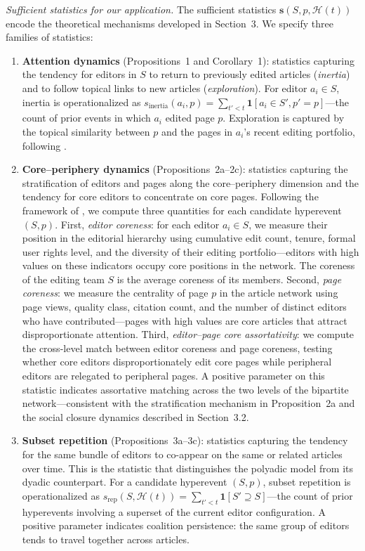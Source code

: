 \documentclass[11pt]{article}
\begin{document}
\emph{Sufficient statistics for our application.} The sufficient statistics $\mathbf{s}(S, p, \mathcal{H}(t))$ encode the theoretical mechanisms developed in Section~3. We specify three families of statistics:

\begin{enumerate}[leftmargin=*, itemsep=4pt]
\item \textbf{Attention dynamics} (Propositions~1 and Corollary~1): statistics capturing the tendency for editors in $S$ to return to previously edited articles (\emph{inertia}) and to follow topical links to new articles (\emph{exploration}). For editor $a_i \in S$, inertia is operationalized as $s_{\text{inertia}}(a_i, p) = \sum_{t' < t} \mathbf{1}[a_i \in S', p' = p]$---the count of prior events in which $a_i$ edited page $p$. Exploration is captured by the topical similarity between $p$ and the pages in $a_i$'s recent editing portfolio, following \citet{Tonellato2024}.

\item \textbf{Core--periphery dynamics} (Propositions~2a--2c): statistics capturing the stratification of editors and pages along the core--periphery dimension and the tendency for core editors to concentrate on core pages. Following the framework of \citet{Borgatti2000}, we compute three quantities for each candidate hyperevent $(S, p)$. First, \emph{editor coreness}: for each editor $a_i \in S$, we measure their position in the editorial hierarchy using cumulative edit count, tenure, formal user rights level, and the diversity of their editing portfolio---editors with high values on these indicators occupy core positions in the network. The coreness of the editing team $S$ is the average coreness of its members. Second, \emph{page coreness}: we measure the centrality of page $p$ in the article network using page views, quality class, citation count, and the number of distinct editors who have contributed---pages with high values are core articles that attract disproportionate attention. Third, \emph{editor--page core assortativity}: we compute the cross-level match between editor coreness and page coreness, testing whether core editors disproportionately edit core pages while peripheral editors are relegated to peripheral pages. A positive parameter on this statistic indicates assortative matching across the two levels of the bipartite network---consistent with the stratification mechanism in Proposition~2a and the social closure dynamics described in Section~3.2.

\item \textbf{Subset repetition} (Propositions~3a--3c): statistics capturing the tendency for the same bundle of editors to co-appear on the same or related articles over time. This is the statistic that distinguishes the polyadic model from its dyadic counterpart. For a candidate hyperevent $(S, p)$, subset repetition is operationalized as $s_{\text{rep}}(S, \mathcal{H}(t)) = \sum_{t' < t} \mathbf{1}[S' \supseteq S]$---the count of prior hyperevents involving a superset of the current editor configuration. A positive parameter indicates coalition persistence: the same group of editors tends to travel together across articles.
\end{enumerate}
\end{document}
